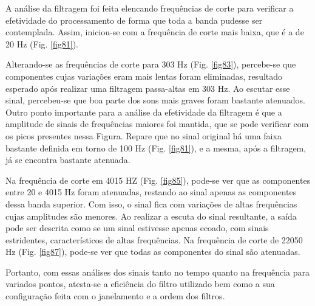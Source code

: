 

A análise da filtragem foi feita elencando frequências de corte para verificar a efetividade do processamento de forma que toda a banda pudesse ser contemplada. Assim, iniciou-se com a frequência de corte mais baixa, que é a de 20 Hz (Fig. \ref{fig81}). 

Alterando-se as frequências de corte para 303 Hz (Fig. \ref{fig83}), percebe-se que componentes cujas variações eram mais lentas foram eliminadas, resultado esperado após realizar uma filtragem passa-altas em 303 Hz. Ao escutar esse sinal, percebeu-se que boa parte dos sons mais graves foram bastante atenuados. Outro ponto importante para a análise da efetividade da filtragem é que a amplitude de sinais de frequências maiores foi mantida, que se pode verificar com os picos presentes nessa Figura. Repare que no sinal original há uma faixa bastante definida em torno de 100 Hz (Fig. \ref{fig81}), e a mesma, após a filtragem, já se encontra bastante atenuada.

Na frequência de corte em 4015 HZ (Fig. \ref{fig85}), pode-se ver que as componentes entre 20 e 4015 Hz foram atenuadas, restando ao sinal apenas as componentes dessa banda superior. Com isso, o sinal fica com variações de altas frequências cujas amplitudes são menores. Ao realizar a escuta do sinal resultante, a saída pode ser descrita como se um sinal estivesse apenas ecoado, com sinais estridentes, característicos de altas frequências. 
Na frequência de corte de 22050 Hz (Fig. \ref{fig87}), pode-se ver que todas as componentes do sinal são atenuadas. 

Portanto, com essas análises dos sinais tanto no tempo quanto na frequência para variados pontos, atesta-se a eficiência do filtro utilizado bem como a sua configuração feita com o janelamento e a ordem dos filtros.





